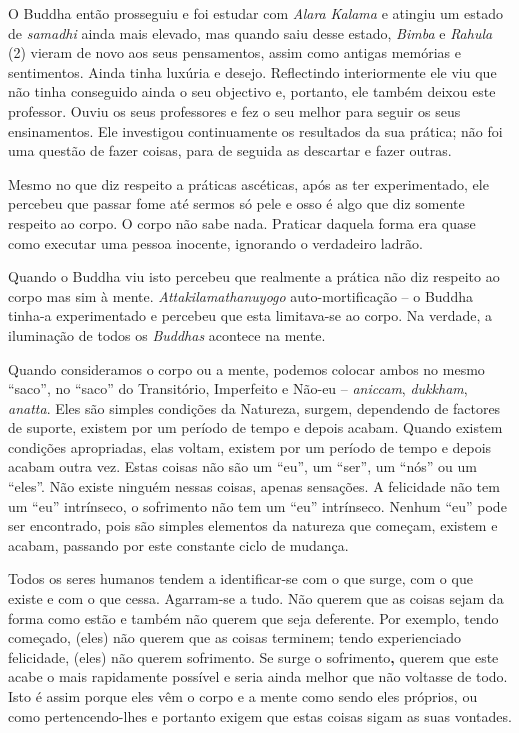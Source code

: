 O Buddha então prosseguiu e foi estudar com \emph{Alara} \emph{Kalama} e
atingiu um estado de \emph{samadhi} ainda mais elevado, mas quando saiu
desse estado, \emph{Bimba} e \emph{Rahula} (2) vieram de novo aos seus
pensamentos, assim como antigas memórias e sentimentos. Ainda tinha
luxúria e desejo. Reflectindo interiormente ele viu que não tinha
conseguido ainda o seu objectivo e, portanto, ele também deixou este
professor. Ouviu os seus professores e fez o seu melhor para seguir os
seus ensinamentos. Ele investigou continuamente os resultados da sua
prática; não foi uma questão de fazer coisas, para de seguida as
descartar e fazer outras.

Mesmo no que diz respeito a práticas ascéticas, após as ter
experimentado, ele percebeu que passar fome até sermos só pele e osso é
algo que diz somente respeito ao corpo. O corpo não sabe nada. Praticar
daquela forma era quase como executar uma pessoa inocente, ignorando o
verdadeiro ladrão.

Quando o Buddha viu isto percebeu que realmente a prática não diz
respeito ao corpo mas sim à mente. \emph{Attakilamathanuyogo}
auto-mortificação -- o Buddha tinha-a experimentado e percebeu que esta
limitava-se ao corpo. Na verdade, a iluminação de todos os
\emph{Buddhas} acontece na mente.

Quando consideramos o corpo ou a mente, podemos colocar ambos no mesmo
``saco'', no ``saco'' do Transitório, Imperfeito e Não-eu --
\emph{aniccam}, \emph{dukkham}, \emph{anatta}. Eles são simples
condições da Natureza, surgem, dependendo de factores de suporte,
existem por um período de tempo e depois acabam. Quando existem
condições apropriadas, elas voltam, existem por um período de tempo e
depois acabam outra vez. Estas coisas não são um ``eu'', um ``ser'', um
``nós'' ou um ``eles''. Não existe ninguém nessas coisas, apenas
sensações. A felicidade não tem um ``eu'' intrínseco, o sofrimento não
tem um ``eu'' intrínseco. Nenhum ``eu'' pode ser encontrado, pois são
simples elementos da natureza que começam, existem e acabam, passando
por este constante ciclo de mudança.

Todos os seres humanos tendem a identificar-se com o que surge, com o
que existe e com o que cessa. Agarram-se a tudo. Não querem que as
coisas sejam da forma como estão e também não querem que seja deferente.
Por exemplo, tendo começado, (eles) não querem que as coisas terminem;
tendo experienciado felicidade, (eles) não querem sofrimento. Se surge o
sofrimento\textbf{,} querem que este acabe o mais rapidamente possível e
seria ainda melhor que não voltasse de todo. Isto é assim porque eles
vêm o corpo e a mente como sendo eles próprios, ou como pertencendo-lhes
e portanto exigem que estas coisas sigam as suas vontades.

